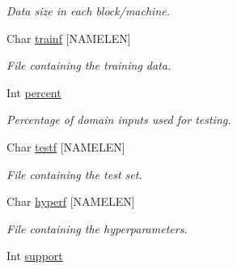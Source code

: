 \begin{DoxyCompactItemize}
\begin{DoxyCompactList}\small\item\em Data size in each block/machine. \end{DoxyCompactList}\item 
\hypertarget{structt__command__prep_a7c6fcd0ab10f8fb7d1f37209ff4754b3}{Char \hyperlink{structt__command__prep_a7c6fcd0ab10f8fb7d1f37209ff4754b3}{trainf} \mbox{[}N\+A\+M\+E\+L\+E\+N\mbox{]}}\label{structt__command__prep_a7c6fcd0ab10f8fb7d1f37209ff4754b3}

\begin{DoxyCompactList}\small\item\em File containing the training data. \end{DoxyCompactList}\item 
\hypertarget{structt__command__prep_a4b948a1a01c4434772d8b34f91023a3b}{Int \hyperlink{structt__command__prep_a4b948a1a01c4434772d8b34f91023a3b}{percent}}\label{structt__command__prep_a4b948a1a01c4434772d8b34f91023a3b}

\begin{DoxyCompactList}\small\item\em Percentage of domain inputs used for testing. \end{DoxyCompactList}\item 
\hypertarget{structt__command__prep_af2e121153fa801d803b0df9b6a4e6180}{Char \hyperlink{structt__command__prep_af2e121153fa801d803b0df9b6a4e6180}{testf} \mbox{[}N\+A\+M\+E\+L\+E\+N\mbox{]}}\label{structt__command__prep_af2e121153fa801d803b0df9b6a4e6180}

\begin{DoxyCompactList}\small\item\em File containing the test set. \end{DoxyCompactList}\item 
\hypertarget{structt__command__prep_adacbfccb9bc1373a0383aeb7e392f303}{Char \hyperlink{structt__command__prep_adacbfccb9bc1373a0383aeb7e392f303}{hyperf} \mbox{[}N\+A\+M\+E\+L\+E\+N\mbox{]}}\label{structt__command__prep_adacbfccb9bc1373a0383aeb7e392f303}

\begin{DoxyCompactList}\small\item\em File containing the hyperparameters. \end{DoxyCompactList}\item 
\hypertarget{structt__command__prep_ac4a2e1b1ae951cef4e6a1b75e5e5556d}{Int \hyperlink{structt__command__prep_ac4a2e1b1ae951cef4e6a1b75e5e5556d}{support}}\label{structt__command__prep_ac4a2e1b1ae951cef4e6a1b75e5e5556d}


\end{DoxyCompactItemize}
